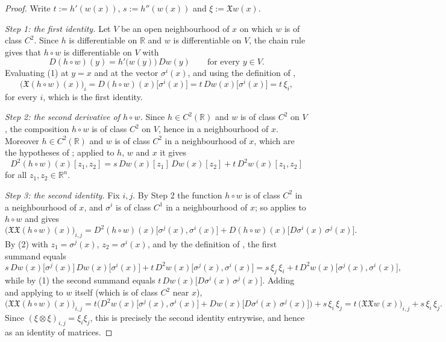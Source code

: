 \begin{proof}
Write $t:=h'(w(x))$, $s:=h''(w(x))$ and $\xi:=\mathfrak{X}w(x)$.

\emph{Step 1: the first identity.} Let $V$ be an open neighbourhood of $x$ on which $w$ is of class
$C^2$. Since $h$ is differentiable on $\mathbb{R}$ and $w$ is differentiable on $V$, the chain
rule gives that $h\circ w$ is differentiable on $V$ with
\begin{equation*}D(h\circ w)(y)=h'\big(w(y)\big)\,Dw(y)\qquad\text{for every }y\in V. \tag{1}\end{equation*}
Evaluating (1) at $y=x$ and at the vector $\sigma^i(x)$, and using the definition of
,
$$\big(\mathfrak{X}(h\circ w)(x)\big)_i=D(h\circ w)(x)\big[\sigma^i(x)\big]
=t\,Dw(x)\big[\sigma^i(x)\big]=t\,\xi_i,$$
for every $i$, which is the first identity.

\emph{Step 2: the second derivative of $h\circ w$.} Since $h\in C^2(\mathbb{R})$ and $w$ is of
class $C^2$ on $V$, the composition $h\circ w$ is of class $C^2$ on $V$, hence in a neighbourhood
of $x$. Moreover $h\in C^2(\mathbb{R})$ and $w$ is of class $C^2$ in a neighbourhood of $x$, which
are the hypotheses of ; applied to $h$, $w$ and $x$ it gives
\begin{equation*}D^2(h\circ w)(x)[z_1,z_2]=s\,Dw(x)[z_1]\,Dw(x)[z_2]+t\,D^2w(x)[z_1,z_2] \tag{2}\end{equation*}
for all $z_1,z_2\in\mathbb{R}^n$.

\emph{Step 3: the second identity.} Fix $i,j$. By Step 2 the function $h\circ w$ is of class $C^2$
in a neighbourhood of $x$, and $\sigma^i$ is of class $C^1$ in a neighbourhood of $x$; so
 applies to $h\circ w$ and gives
$$\big(\mathfrak{X}\mathfrak{X}(h\circ w)(x)\big)_{i,j}
=D^2(h\circ w)(x)\big[\sigma^j(x),\sigma^i(x)\big]
+D(h\circ w)(x)\big[D\sigma^i(x)\,\sigma^j(x)\big].$$
By (2) with $z_1=\sigma^j(x)$, $z_2=\sigma^i(x)$, and by the definition of , the
first summand equals
$$s\,Dw(x)\big[\sigma^j(x)\big]\,Dw(x)\big[\sigma^i(x)\big]
+t\,D^2w(x)\big[\sigma^j(x),\sigma^i(x)\big]
=s\,\xi_j\,\xi_i+t\,D^2w(x)\big[\sigma^j(x),\sigma^i(x)\big],$$
while by (1) the second summand equals
$t\,Dw(x)\big[D\sigma^i(x)\,\sigma^j(x)\big]$. Adding and applying
 to $w$ itself (which is of class $C^2$ near $x$),
$$\big(\mathfrak{X}\mathfrak{X}(h\circ w)(x)\big)_{i,j}
=t\Big(D^2w(x)\big[\sigma^j(x),\sigma^i(x)\big]+Dw(x)\big[D\sigma^i(x)\,\sigma^j(x)\big]\Big)
+s\,\xi_i\,\xi_j
=t\,\big(\mathfrak{X}\mathfrak{X}w(x)\big)_{i,j}+s\,\xi_i\,\xi_j .$$
Since $(\xi\otimes\xi)_{i,j}=\xi_i\xi_j$, this is precisely the second identity entrywise, and
hence as an identity of matrices.
\end{proof}
